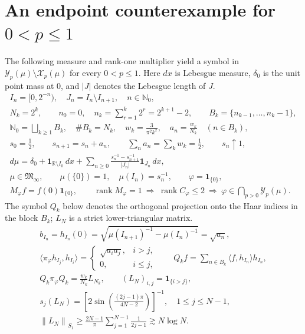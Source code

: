 \documentclass[11pt]{amsart}
\newcommand{\X}{\mathcal X}
\newcommand{\Y}{\mathcal Y}
\newcommand{\ip}[2]{\langle #1,#2\rangle}
\newcommand{\norm}[1]{\left\|#1\right\|}
\newcommand{\rank}{\operatorname{rank}}
\begin{document}
\section{An endpoint counterexample for \texorpdfstring{$0<p\le1$}{0 < p <= 1}}\label{sec-endpoint-example}
The following measure and rank-one multiplier yield a symbol in
$\Y_p(\mu)\setminus\X_p(\mu)$ for every $0<p\le1$. Here $dx$ is
Lebesgue measure, $\delta_0$ is the unit point mass at $0$, and $|J|$
denotes the Lebesgue length of $J$.
\begin{gather*}
 I_n=[0,2^{-n}),\quad J_n=I_n\setminus I_{n+1},\quad n\in\mathbb N_0,\\
 N_k=2^k,\qquad n_0=0,\quad n_k=\sum_{r=1}^k2^r=2^{k+1}-2,\qquad
 B_k=\{n_{k-1},\ldots,n_k-1\},\\
 \mathbb N_0=\bigsqcup_{k\ge1}B_k,\quad\#B_k=N_k,\quad
 w_k=\frac3{\pi^2k^2},\quad
 a_n=\frac{w_k}{N_k}\quad(n\in B_k),\\
 s_0=\tfrac12,\qquad s_{n+1}=s_n+a_n,\qquad
 \sum_na_n=\sum_kw_k=\tfrac12,\qquad s_n\uparrow1,\\
 d\mu=\delta_0+\mathbf1_{\mathbb R\setminus I_0}\,dx
       +\sum_{n\ge0}\frac{s_n^{-1}-s_{n+1}^{-1}}{|J_n|}
                                      \mathbf1_{J_n}\,dx,\\
 \mu\in\mathfrak M_\infty,\qquad
 \mu(\{0\})=1,\quad\mu(I_n)=s_n^{-1},\qquad
 \varphi=\mathbf1_{\{0\}},\\
 M_\varphi f=f(0)\mathbf1_{\{0\}},\qquad
 \rank M_\varphi=1
 \ \Longrightarrow\
 \rank C_\varphi\le2
 \ \Longrightarrow\
 \varphi\in\bigcap_{p>0}\Y_p(\mu).
\end{gather*}
The symbol $Q_k$ below denotes the orthogonal projection onto the
Haar indices in the block $B_k$; $L_N$ is a strict lower-triangular
matrix.
\begin{gather*}
 b_{I_n}=h_{I_n}(0)
 =\sqrt{\mu(I_{n+1})^{-1}-\mu(I_n)^{-1}}=\sqrt{a_n},\\
 \ip{\pi_\varphi h_{I_j}}{h_{I_i}}
   =\begin{cases}\sqrt{a_ia_j},&i>j,\\0,&i\le j,\end{cases}\qquad
 Q_kf=\sum_{n\in B_k}\ip{f}{h_{I_n}}h_{I_n},\\
 Q_k\pi_\varphi Q_k=\frac{w_k}{N_k}L_{N_k},\qquad
 (L_N)_{i,j}=\mathbf1_{\{i>j\}},\\
 s_j(L_N)=\left[2\sin\left(\frac{(2j-1)\pi}{4N-2}\right)\right]^{-1},
                         \quad1\le j\le N-1,\\
 \norm{L_N}_{S_1}
  \ge\frac{2N-1}{\pi}\sum_{j=1}^{N-1}\frac1{2j-1}
  \gtrsim N\log N.
\end{gather*}
\end{document}
